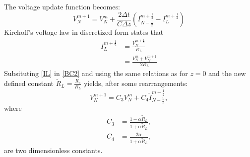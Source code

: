 \documentclass[dutch, a4paper, 11pt]{article}
\begin{document}
\begin{multicols}{2}
\begin{itemize}
    The voltage update function becomes:
    \begin{equation}
        V^{m+1}_{N} = V^{m}_{N} + \frac{2\Delta t}{C\Delta z}\left(I^{m+\frac{1}{2}}_{N-\frac{1}{2}} - I^{m+\frac{1}{2}}_{L}\right)
        \label{BC2}
    \end{equation}
    Kirchoff's voltage law in discretized form states that
    \begin{align}
        I^{m+\frac{1}{2}}_{L} & = \frac{V^{m+\frac{1}{2}}_{N}}{R_{L}}\\
        & = \frac{V^{m}_{N}+V^{m+1}_{N}}{2R_{L}}
        \label{IL}
    \end{align}
    Subsituting \ref{IL} in \ref{BC2} and using the same relations as for $z=0$ and the new defined constant $\tilde{R}_{L} = \frac{R_c}{R_L}$ yields, 
    after some rearrangements:
    \begin{equation}
        V^{m+1}_{N} = C_{3}V^{m}_N + C_{4}\tilde{I}^{m+\frac{1}{2}}_{N-\frac{1}{2}},
    \end{equation}
    where
    \begin{align}
        C_{3} & = \frac{1-\alpha\tilde{R}_{L}}{1+\alpha\tilde{R}_{L}},\\
        C_{4} & = \frac{2\alpha}{1+\alpha\tilde{R}_{L}},
    \end{align}
    are two dimensionless constants.
\end{itemize}

\end{multicols}
\end{document}
